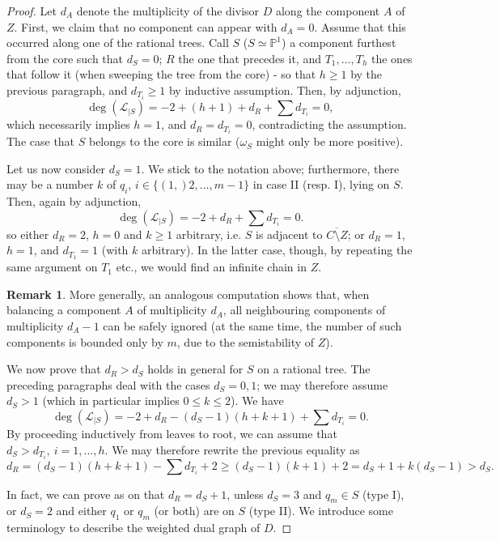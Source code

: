 \documentclass[11pt]{amsart}
\newcommand{\PP}{\mathbb P}
\theoremstyle{plain}
\theoremstyle{definition}
\newtheorem{rem}[thm]{Remark}
\begin{document}
\begin{proof}
Let $d_A$ denote the multiplicity of the divisor $D$ along the component $A$ of $Z$. First, we claim that no component can appear with $d_A=0$. Assume that this occurred along one of the rational trees. Call $S$ ($S\simeq\PP^1$) a component furthest from the core such that $d_S=0$; $R$ the one that precedes it, and $T_1,\ldots, T_h$ the ones that follow it (when sweeping the tree from the core) - so that $h\geq1$ by the previous paragraph, and $d_{T_i}\geq 1$ by inductive assumption. Then, by adjunction,
 \[\deg(\mathcal L_{|S})= -2+(h+1)+d_R+\sum d_{T_i}=0,\]
 which necessarily implies $h=1$, and $d_R=d_{T_i}=0$, contradicting the assumption. The case that $S$ belongs to the core is similar ($\omega_S$ might only be more positive).
 
Let us now consider $d_S=1$. We stick to the notation above; furthermore, there may be a number $k$ of $q_i$, $i\in\{(1,)2,\ldots,m-1\}$ in case II (resp. I), lying on $S$. Then, again by adjunction,
 \[\deg(\mathcal L_{|S})= -2+d_R+\sum d_{T_i}=0.\]
 so either $d_R=2$, $h=0$ and $k\geq 1$ arbitrary, i.e. $S$ is adjacent to $\overline{C\setminus Z}$; or $d_R=1$, $h=1$, and $d_{T_1}=1$ (with $k$ arbitrary). In the latter case, though, by repeating the same argument on $T_1$ etc., we would find an infinite chain in $Z$. 
 \begin{rem}\label{rmk:ignoring_1-trees}
  More generally, an analogous computation shows that, when balancing a component $A$ of multiplicity $d_A$, all neighbouring components of multiplicity $d_A-1$ can be safely ignored (at the same time, the number of such components is bounded only by $m$, due to the semistability of $Z$).%
 \end{rem}

 We now prove that $d_R>d_S$ holds in general for $S$ on a rational tree. The preceding paragraphs deal with the cases $d_S=0,1$; we may therefore assume $d_S>1$ (which in particular implies $0\leq k\leq 2$). We have
 \[\deg(\mathcal L_{|S})= -2+d_R-(d_S-1)(h+k+1)+\sum d_{T_i}=0.\]
 By proceeding inductively from leaves to root, we can assume that $d_S>d_{T_i},\ i=1,\ldots,h$. We may therefore rewrite the previous equality as
 \[d_R=(d_S-1)(h+k+1)-\sum d_{T_i}+2\geq(d_S-1)(k+1)+2=d_S+1+k(d_S-1)>d_S.\]
 
In fact, we can prove as on \cite[p.893]{SMY1} that $d_R=d_S+1$, unless $d_S=3$ and $q_m\in S$ (type I), or $d_S=2$ and either $q_1$ or $q_m$ (or both) are on $S$ (type II). We introduce some terminology to describe the weighted dual graph of $D$.


\end{proof}
\end{document}
